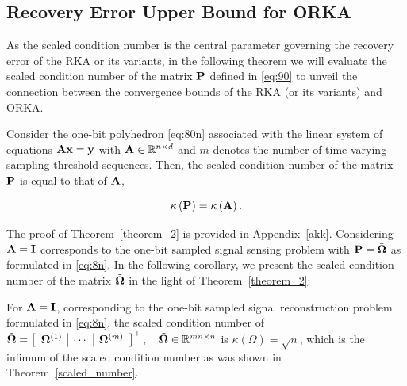 \documentclass[12pt,draftcls,onecolumn]{IEEEtran}
\begin{document}
\subsection{Recovery Error Upper Bound for ORKA}
\label{error}
As the scaled condition number is the central parameter governing the recovery error of the RKA or its variants, in the following theorem we will evaluate the scaled condition number of the matrix $\mathbf{P}$ defined in \eqref{eq:90} to unveil the connection between the convergence bounds of the RKA (or its variants) and ORKA.
\begin{theorem}
\label{theorem_2}
Consider the one-bit polyhedron \eqref{eq:80n} associated with the linear system of equations $\mathbf{A}\mathbf{x}=\mathbf{y}$ with $\mathbf{A}\in\mathbb{R}^{n\times d}$ and $m$ denotes the number of time-varying sampling threshold sequences. Then, the scaled condition number of the matrix $\mathbf{P}$ is equal to that of $\mathbf{A}$,

\begin{equation}
\kappa\left(\mathbf{P}\right)=\kappa\left(\mathbf{A}\right).   
\end{equation}
\end{theorem}\normalsize
The proof of Theorem~\ref{theorem_2} is provided in Appendix~\ref{akk}.
Considering $\mathbf{A}=\mathbf{I}$ corresponds to the one-bit sampled signal sensing problem with $\mathbf{P}=\Tilde{\boldsymbol{\Omega}}$ as formulated in \eqref{eq:8n}. In the following corollary, we present the scaled condition number of the matrix $\Tilde{\boldsymbol{\Omega}}$ in the light of Theorem~\ref{theorem_2}:
\begin{corollary}
\label{col_1}
For $\mathbf{A}=\mathbf{I}$, corresponding to the one-bit sampled signal reconstruction problem formulated in \eqref{eq:8n}, the scaled condition number of $\Tilde{\boldsymbol{\Omega}}=\left[\begin{array}{c|c|c}
\boldsymbol{\Omega}^{(1)} &\cdots &\boldsymbol{\Omega}^{(m)}
\end{array}\right]^{\top}, \quad \Tilde{\boldsymbol{\Omega}}\in \mathbb{R}^{m n\times n}$ is $\kappa\left(\Omega\right)=\sqrt{n}$, which is the infimum of the scaled condition number as was shown in Theorem~\ref{scaled_number}.
\end{corollary}
\end{document}
